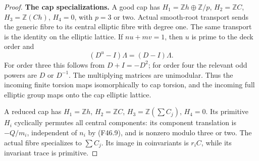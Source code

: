\begin{proof}
\par\medskip\noindent\textbf{The cap specializations.}
A good cap has
$H_1=\mathbb Zh\oplus\mathbb Z/p$, $H_2=\mathbb ZC$,
$H_3=\mathbb Z(Ch)$, $H_4=0$, with $p=3$ or two.
Actual smooth-root transport sends the generic fibre to its
central elliptic fibre with degree one. The same transport is
the identity on the elliptic lattice. If $nu+mv=1$, then $u$
is prime to the deck order and
\[
                    (D^u-I)\Lambda=(D-I)\Lambda.
\]
For order three this follows from $D+I=-D^2$; for order four
the relevant odd powers are $D$ or $D^{-1}$.
The multiplying matrices are unimodular. Thus the incoming
finite torsion maps isomorphically to cap torsion, and the
incoming full elliptic group maps onto the cap elliptic lattice.

A reduced cap has $H_1=\mathbb Zh$, $H_2=\mathbb ZC$,
$H_3=\mathbb Z(\sum C_j)$, $H_4=0$.
Its primitive $H_i$ cyclically permutes all central components:
its component translation is $-Q/m_i$, independent of $n_i$
by (F46.9), and is nonzero modulo three or two.
The actual fibre specializes to $\sum C_j$. Its image in
coinvariants is $r_iC$, while its invariant trace is primitive.


\end{proof}
